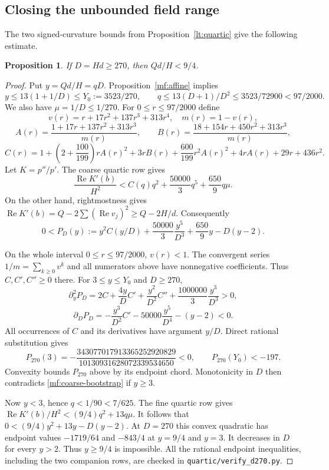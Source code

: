 \documentclass[11pt,reqno]{amsart}
\numberwithin{equation}{section}
\newtheorem{proposition}[theorem]{Proposition}
\theoremstyle{definition}
\theoremstyle{remark}
\renewcommand{\Re}{\operatorname{Re}}
\DeclareRobustCommand{\cert}[1]{\nolinkurl{#1}}
\begin{document}
\subsection{Closing the unbounded field range}

The two signed-curvature bounds from Proposition~\ref{lt:quartic}
give the following estimate.

\begin{proposition}\label{mf:D270}
If $D=Hd\ge270$, then $Qd/H<9/4$.
\end{proposition}
\begin{proof}
Put $y=Qd/H=qD$. Proposition~\ref{mf:affine} implies
\[
 y\le13(1+1/D)\le Y_0:=3523/270,\qquad
 q\le13(D+1)/D^2\le3523/72900<97/2000.
\]
We also have $\mu=1/D\le1/270$.
For $0\le r\le97/2000$ define
\[
 v(r)=r+17r^2+137r^3+313r^4,\quad m(r)=1-v(r),
\]
\[
 A(r)=\frac{1+17r+137r^2+313r^3}{m(r)},\qquad
 B(r)=\frac{18+154r+450r^2+313r^3}{m(r)},
\]
\[
 C(r)=1+\left(2+\frac{100}{199}\right)rA(r)^2
 +3rB(r)+\frac{600}{199}r^2A(r)^2
 +4rA(r)+29r+436r^2.
\]
Let $K=p''/p'$. The coarse quartic row gives
\[
 \frac{\Re K'(b)}{H^2}
 <C(q)q^2+\frac{50000}{3}q^5+\frac{650}{9}q\mu.
\]
On the other hand, rightmostness gives
$\Re K'(b)=Q-2\sum(\Re v_j)^2\ge Q-2H/d$.
Consequently
\begin{equation}\label{mf:coarse-bootstrap}
 0<P_D(y):=y^2C(y/D)+\frac{50000}{3}\frac{y^5}{D^3}
                       +\frac{650}{9}y-D(y-2).
\end{equation}

On the whole interval $0\le r\le97/2000$, $v(r)<1$.
The convergent series $1/m=\sum_{k\ge0}v^k$ and all numerators
above have nonnegative coefficients. Thus $C,C',C''\ge0$ there.
For $3\le y\le Y_0$ and $D\ge270$,
\[
 \partial_y^2P_D
 =2C+\frac{4y}{D}C'+\frac{y^2}{D^2}C''
                      +\frac{1000000}{3}\frac{y^3}{D^3}>0,
\]
\[
 \partial_DP_D=-\frac{y^3}{D^2}C'
                    -50000\frac{y^5}{D^4}-(y-2)<0.
\]
All occurrences of $C$ and its derivatives have argument $y/D$.
Direct rational substitution gives
\[
 P_{270}(3)=
 -\frac{343077017913365252920829}{10130931628072339534650}<0,
 \qquad P_{270}(Y_0)<-197.
\]
Convexity bounds $P_{270}$ above by its endpoint chord.
Monotonicity in $D$ then contradicts
\eqref{mf:coarse-bootstrap} if $y\ge3$.

Now $y<3$, hence $q<1/90<7/625$.
The fine quartic row gives
$\Re K'(b)/H^2<(9/4)q^2+13q\mu$.
It follows that
$0<(9/4)y^2+13y-D(y-2)$.
At $D=270$ this convex quadratic has endpoint values
$-1719/64$ and $-843/4$ at $y=9/4$ and $y=3$.
It decreases in $D$ for every $y>2$. Thus $y\ge9/4$ is
impossible. All the rational endpoint inequalities, including
the two companion rows, are checked in
\cert{quartic/verify_d270.py}.
\end{proof}
\end{document}
